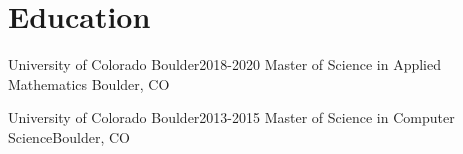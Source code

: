 \section{Education}

\resumeSubHeadingListStart

    \resumeSubheading
    {University of Colorado Boulder}{2018-2020}
    {Master of Science in Applied Mathematics} {Boulder, CO}
  
     \resumeSubheading
    {University of Colorado Boulder}{2013-2015}
    {Master of Science in Computer Science}{Boulder, CO}
    
\resumeSubHeadingListEnd
